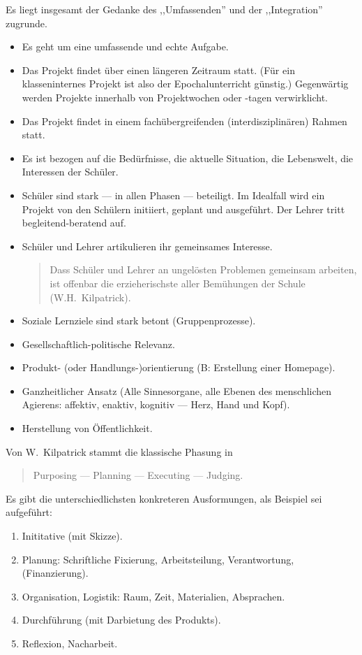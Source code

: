 Es liegt insgesamt der Gedanke des ,,Umfassenden'' und der
,,Integration'' zugrunde.
\begin{itemize}
\item
Es geht um eine umfassende und echte Aufgabe.
\item
Das Projekt findet \"{u}ber einen l\"{a}ngeren Zeitraum statt.
(F\"{u}r ein klasseninternes Projekt ist also der
Epochalunterricht g\"{u}nstig.)
Gegenw\"{a}rtig werden Projekte innerhalb von Projektwochen
oder -tagen verwirklicht.
\item
Das Projekt findet in einem fach\"{u}bergreifenden
(interdisziplin\"{a}ren) Rahmen statt.
\item
Es ist bezogen auf die Bed\"{u}rfnisse, die aktuelle Situation, die
Lebenswelt, die    Interessen der Sch\"{u}ler.
\item
Sch\"{u}ler sind stark --- in allen Phasen --- beteiligt.
Im Idealfall wird ein Projekt von den Sch\"{u}lern initiiert, geplant
und ausgef\"{u}hrt.
Der Lehrer tritt begleitend-beratend auf.
\item
Sch\"{u}ler und Lehrer artikulieren ihr gemeinsames Interesse.
\begin{quote}
\footnotesize
Dass Sch\"{u}ler und Lehrer an ungel\"{o}sten Problemen gemeinsam
arbeiten, ist offenbar die erzieherischste aller Bem\"{u}hungen der
Schule (W.H.\ Kilpatrick).
\end{quote}
\item
Soziale Lernziele sind stark betont (Gruppenprozesse).
\item
Gesellschaftlich-politische Relevanz.
\item
Produkt- (oder Handlungs-)orientierung (B: Erstellung einer Homepage).
\item
Ganzheitlicher Ansatz (Alle Sinnesorgane, alle Ebenen des
menschlichen Agierens: affektiv, enaktiv, kognitiv --- Herz,
Hand und Kopf).
\item
Herstellung von \"{O}ffentlichkeit.
\end{itemize}


Von W.\ Kilpatrick stammt die klassische Phasung in
\begin{quote}
Purposing --- Planning --- Executing --- Judging.
\end{quote}

Es gibt die unterschiedlichsten konkreteren Ausformungen, als Beispiel sei
aufgef\"{u}hrt:
\begin{enumerate}
\item
Inititative (mit Skizze).
\item
Planung: Schriftliche Fixierung, Arbeitsteilung, Verantwortung,
(Finanzierung).
\item
Organisation, Logistik: Raum, Zeit, Materialien, Absprachen.
\item
Durchf\"{u}hrung (mit Darbietung des Produkts).
\item
Reflexion, Nacharbeit.
\end{enumerate}

